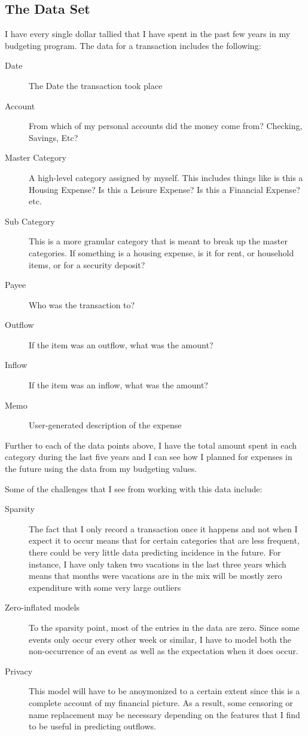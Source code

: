 \documentclass[11pt,a4paper]{article}
\begin{document}
\subsection{The Data Set}
I have every single dollar tallied that I have spent in the past few years in my budgeting program. The data for a transaction includes the following:
\begin{description}
	\item[Date] The Date the transaction took place
	\item[Account] From which of my personal accounts did the money come from? Checking, Savings, Etc?
	\item[Master Category] A high-level category assigned by myself. This includes things like is this a Housing Expense? Is this a Leisure Expense? Is this a Financial Expense? etc.
	\item[Sub Category] This is a more granular category that is meant to break up the master categories. If something is a housing expense, is it for rent, or household items, or for a security deposit?
	\item[Payee] Who was the transaction to?
	\item[Outflow] If the item was an outflow, what was the amount?
	\item[Inflow] If the item was an inflow, what was the amount?
	\item[Memo] User-generated description of the expense
\end{description}

Further to each of the data points above, I have the total amount spent in each category during the last five years and I can see how I planned for expenses in the future using the data from my budgeting values. 

Some of the challenges that I see from working with this data include:
\begin{description}
	\item[Sparsity] The fact that I only record a transaction once it happens and not when I expect it to occur means that for certain categories that are less frequent, there could be very little data predicting incidence in the future. For instance, I have only taken two vacations in the last three years which means that months were vacations are in the mix will be mostly zero expenditure with some very large outliers
	\item[Zero-inflated models] To the sparsity point, most of the entries in the data are zero. Since some events only occur every other week or similar, I have to model both the non-occurrence of an event as well as the expectation when it does occur.
	\item[Privacy] This model will have to be anoymonized to a certain extent since this is a complete account of my financial picture. As a result, some censoring or name replacement may be necessary depending on the features that I find to be useful in predicting outflows.
\end{description}
\end{document}
